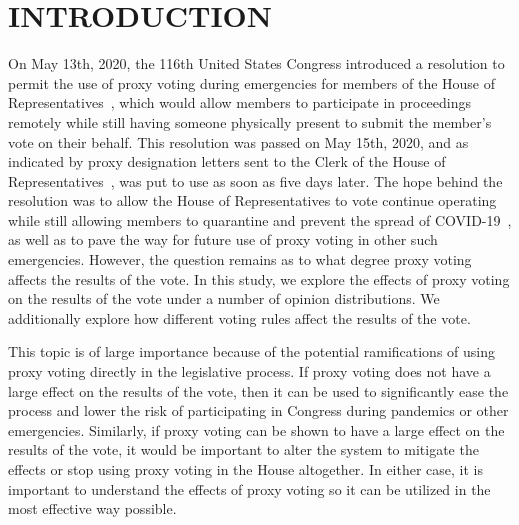 %
%

\chapter{INTRODUCTION}\label{ch:introduction}
\thispagestyle{empty}
On May 13th, 2020, the 116th United States Congress introduced a resolution
to permit the use of proxy voting during emergencies for members of the House of
Representatives~\cite{Congress.gov2020}, which would allow members to participate in
proceedings remotely while still having someone physically present to submit the
member's vote on their behalf.
This resolution was passed on May 15th, 2020, and as indicated by proxy designation
letters sent to the Clerk of the House of Representatives~\cite{Clerk.House.gov2022},
was put to use as soon as five days later.
The hope behind the resolution was to allow the House of Representatives
to vote continue operating  while still allowing members to quarantine and
prevent the spread of COVID-19~\cite{Congress.gov2020}, as well as to pave the way for
future use of proxy voting in other such emergencies.
However, the question remains as to what degree proxy voting affects the results of
the vote.
In this study, we explore the effects of proxy voting on the results of the vote
under a number of opinion distributions.
We additionally explore how different voting rules affect the results of the vote.

This topic is of large importance because of the potential ramifications of using
proxy voting directly in the legislative process.
If proxy voting does not have a large effect on the results of the vote, then it
can be used to significantly ease the process and lower the risk of participating in
Congress during pandemics or other emergencies.
Similarly, if proxy voting can be shown to have a large effect on the results of the
vote, it would be important to alter the system to mitigate the effects or stop using
proxy voting in the House altogether.
In either case, it is important to understand the effects of proxy voting so it can
be utilized in the most effective way possible.



